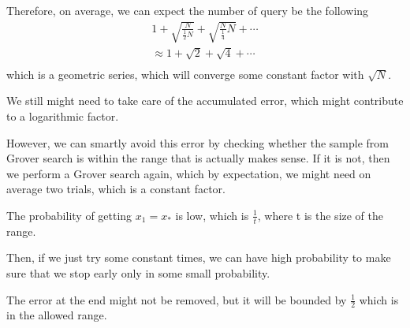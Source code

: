 \documentclass{article}
\theoremstyle{definition}
\begin{document}
Therefore, on average, we can expect the number of query be the following
\[
  \begin{split}
    1 + \sqrt{\frac{N}{\frac{1}{2}N}} + \sqrt{\frac{N}{\frac{1}{4}}N} + \cdots \\
    \approx 1 + \sqrt{2} + \sqrt{4} + \cdots \\
  \end{split}
\]
which is a geometric series, which will converge some constant factor with \(\sqrt{N}\).

We still might need to take care of the accumulated error, which might contribute to a logarithmic factor.

However, we can smartly avoid this error by checking whether the sample from Grover
search is within the range that is actually makes sense. If it is not, then we perform
a Grover search again, which by expectation, we might need on average two trials, which is a constant factor.

The probability of getting \(x_1 = x_*\) is low, which is \(\frac{1}{t}\), where t is the size of the range.

Then, if we just try some constant times, we can have high probability to make sure that we stop early only in
some small probability.

The error at the end might not be removed, but it will be bounded by \(\frac{1}{2}\) which is in the allowed range.
\end{document}
